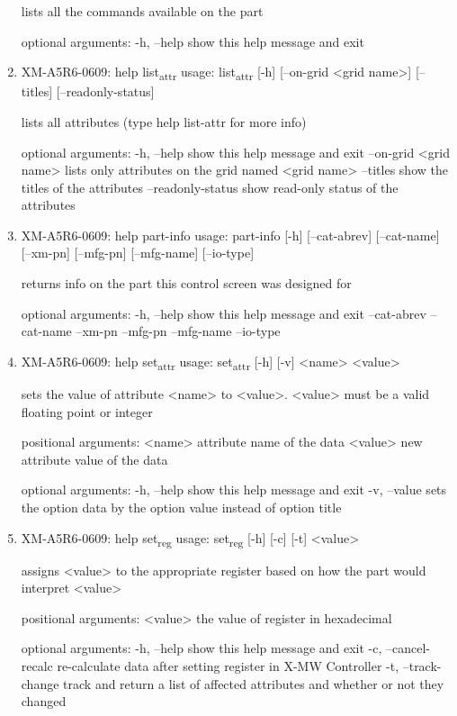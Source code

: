 \documentclass[11pt]{article}
\begin{document}
\begin{enumerate}
lists all the commands available on the part

optional arguments:
  -h, --help  show this help message and exit

\item XM-A5R6-0609: help list\textsubscript{attr}
\label{sec:orgd4315f9}
usage: list\textsubscript{attr} [-h] [--on-grid <grid name>] [--titles] [--readonly-status]

lists all attributes (type help list-attr for more info)

optional arguments:
  -h, --help            show this help message and exit
  --on-grid <grid name>
                        lists only attributes on the grid named <grid name>
  --titles              show the titles of the attributes
  --readonly-status     show read-only status of the attributes

\item XM-A5R6-0609: help part-info
\label{sec:org354b50a}
usage: part-info  [-h] [--cat-abrev] [--cat-name] [--xm-pn] [--mfg-pn] [--mfg-name]
        [--io-type]

returns info on the part this control screen was designed for

optional arguments:
  -h, --help   show this help message and exit
  --cat-abrev
  --cat-name
  --xm-pn
  --mfg-pn
  --mfg-name
  --io-type

\item XM-A5R6-0609: help set\textsubscript{attr}
\label{sec:orgb003305}
usage: set\textsubscript{attr} [-h] [-v] <name> <value>

sets the value of attribute <name> to <value>. <value> must be a valid
floating point or integer

positional arguments:
  <name>       attribute name of the data
  <value>      new attribute value of the data

optional arguments:
  -h, --help   show this help message and exit
  -v, --value  sets the option data by the option value instead of option
               title

\item XM-A5R6-0609: help set\textsubscript{reg}
\label{sec:org626da8a}
usage: set\textsubscript{reg} [-h] [-c] [-t] <value>

assigns <value> to the appropriate register based on how the part would
interpret <value>

positional arguments:
  <value>              the value of register in hexadecimal

optional arguments:
  -h, --help           show this help message and exit
  -c, --cancel-recalc  re-calculate data after setting register in X-MW
                       Controller
  -t, --track-change   track and return a list of affected attributes and
                       whether or not they changed


\end{enumerate}
\end{document}
